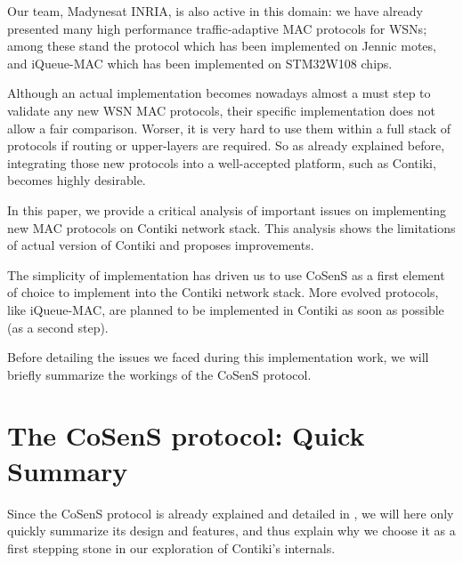 \documentclass[12pt,twoside,a4paper]{article}
\begin{document}
\newpage

Our team, Madynes\footnotemark[2] at INRIA, is also active in this domain:
we have already presented many high performance traffic-adaptive MAC
protocols for WSNs; among these stand the  \cite{cosens}
protocol which has been implemented on Jennic motes, and iQueue-MAC
\cite{iqueue-mac} which has been implemented on STM32W108 chips.


Although an actual implementation becomes nowadays almost a must step
to validate any new WSN MAC protocols, their specific implementation
does not allow a fair comparison. Worser, it is very hard to use them
within a full stack of protocols if routing or upper-layers are required.
So as already explained before, integrating those new protocols into
a well-accepted platform, such as Contiki, becomes highly desirable.

In this paper, we provide a critical analysis of important issues on
implementing new MAC protocols on Contiki network stack. This analysis
shows the limitations of actual version of Contiki and proposes improvements.

The simplicity of implementation has driven us to use CoSenS as a first
element of choice to implement into the Contiki network stack.
More evolved protocols, like iQueue-MAC, are planned to be implemented
in Contiki as soon as possible (as a second step).

Before detailing the issues we faced during this implementation work,
we will briefly summarize the workings of the CoSenS protocol.


\section{The CoSenS protocol: Quick Summary}

Since the CoSenS protocol is already explained and detailed in \cite{cosens},
we will here only quickly summarize its design and features, and thus explain
why we choose it as a first stepping stone in our exploration of Contiki's
internals.
\end{document}
